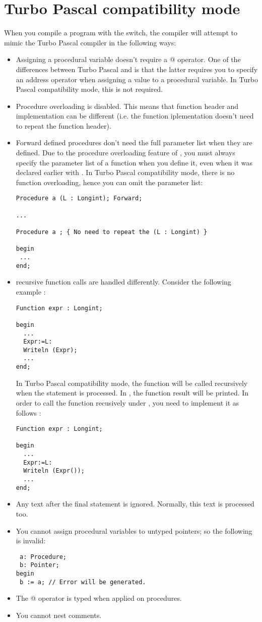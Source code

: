 \documentclass{book}
\begin{document}
\section{Turbo Pascal compatibility mode}
When you compile a program with the  switch, the compiler will
attempt to mimic the Turbo Pascal compiler in the following ways:
\begin{itemize}
\item Assigning a procedural variable doesn't require a @ operator. One of
the differences between Turbo Pascal and \fpc is that the latter requires
you to specify an address operator when assigning a value to a procedural
variable. In Turbo Pascal compatibility mode, this is not required.
\item Procedure overloading is disabled. This means that function header and
implementation can be different (i.e. the function iplementation doesn't
need to repeat the function header).
\item Forward defined procedures don't need the full parameter list when
they are defined. Due to the procedure overloading feature of \fpc, you must
always specify the parameter list of a function when you define it, even
when it was declared earlier with . In Turbo Pascal
compatibility mode, there is no function overloading, hence you can omit the
parameter list:
\begin{verbatim}
Procedure a (L : Longint); Forward;

...

Procedure a ; { No need to repeat the (L : Longint) }

begin
 ...
end;

\end{verbatim}
\item recursive function calls are handled differently. Consider the
following example :
\begin{verbatim}
Function expr : Longint;

begin
  ...
  Expr:=L:
  Writeln (Expr);
  ...
end;
\end{verbatim}
In Turbo Pascal compatibility mode, the function will be called recursively
when the  statement is processed. In \fpc, the function result
will be printed. In order to call the function recusively under \fpc, you
need to implement it as follows :
\begin{verbatim}
Function expr : Longint;

begin
  ...
  Expr:=L:
  Writeln (Expr());
  ...
end;
\end{verbatim}
\item Any text after the final  statement is ignored. Normally,
this text is processed too.
\item You cannot assign procedural variables to untyped pointers; so the
following is invalid:
\begin{verbatim}
 a: Procedure;
 b: Pointer;
begin
 b := a; // Error will be generated.
\end{verbatim}
\item The @ operator is typed when applied on procedures.
\item You cannot nest comments.
\end{itemize}
\end{document}
